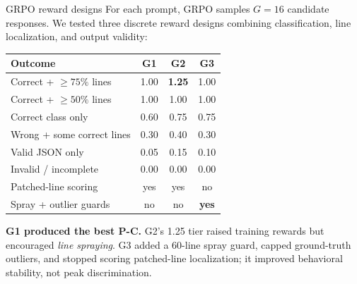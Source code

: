 \documentclass[final]{beamer}
\begin{document}
\begin{frame}[t]
\begin{center}
\begin{minipage}[t]{0.306\textwidth}
\begin{posterblock}{GRPO reward designs}
For each prompt, GRPO samples $G=16$ candidate responses. We tested three discrete reward designs combining classification, line localization, and output validity:
\vspace{0.35em}
{\fontsize{17}{21}\selectfont
\begin{center}
\begin{tabular}{>{\raggedright\arraybackslash}p{8.1cm}ccc}
\toprule
\textbf{Outcome} & \textbf{G1} & \textbf{G2} & \textbf{G3}\\
\midrule
Correct + $\geq75\%$ lines & \cellcolor{blue!12}1.00 & \cellcolor{orange!25}\textbf{1.25} & \cellcolor{green!15}1.00\\
Correct + $\geq50\%$ lines & \cellcolor{blue!12}1.00 & \cellcolor{orange!18}1.00 & \cellcolor{green!15}1.00\\
Correct class only & \cellcolor{blue!8}0.60 & \cellcolor{orange!13}0.75 & \cellcolor{green!12}0.75\\
Wrong + some correct lines & 0.30 & 0.40 & 0.30\\
Valid JSON only & 0.05 & 0.15 & 0.10\\
Invalid / incomplete & 0.00 & 0.00 & 0.00\\
\midrule
Patched-line scoring & yes & yes & no\\
Spray + outlier guards & no & no & \textbf{yes}\\
\bottomrule
\end{tabular}
\end{center}
}
\vspace{0.35em}
\textbf{G1 produced the best P-C.} G2's 1.25 tier raised training rewards but encouraged \emph{line spraying}. G3 added a 60-line spray guard, capped ground-truth outliers, and stopped scoring patched-line localization; it improved behavioral stability, not peak discrimination.
\end{posterblock}


\end{minipage}
\end{center}
\end{frame}
\end{document}
